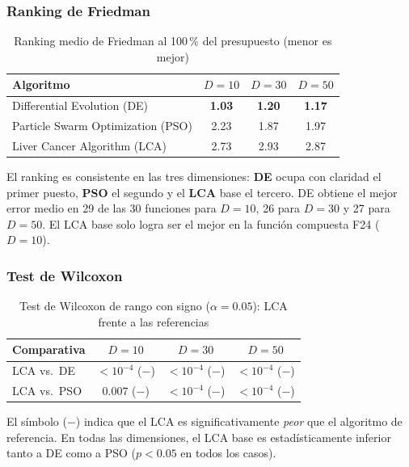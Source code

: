 \subsubsection{Ranking de Friedman}

\begin{table}[h!]
\centering
\caption{Ranking medio de Friedman al 100\,\% del presupuesto (menor es mejor)}
\label{tab:friedman}
\renewcommand{\arraystretch}{1.3}
\begin{tabular}{@{}lccc@{}}
\toprule
\textbf{Algoritmo} & \textbf{$D=10$} & \textbf{$D=30$} & \textbf{$D=50$} \\
\midrule
Differential Evolution (DE)        & \textbf{1.03} & \textbf{1.20} & \textbf{1.17} \\
Particle Swarm Optimization (PSO)  & 2.23 & 1.87 & 1.97 \\
Liver Cancer Algorithm (LCA)       & 2.73 & 2.93 & 2.87 \\
\bottomrule
\end{tabular}
\end{table}

El ranking es consistente en las tres dimensiones: \textbf{DE} ocupa con claridad el primer
puesto, \textbf{PSO} el segundo y el \textbf{LCA} base el tercero. DE obtiene el mejor error
medio en 29 de las 30 funciones para $D=10$, 26 para $D=30$ y 27 para $D=50$. El LCA base
solo logra ser el mejor en la función compuesta F24 ($D=10$).

\subsubsection{Test de Wilcoxon}

\begin{table}[h!]
\centering
\caption{Test de Wilcoxon de rango con signo ($\alpha=0.05$): LCA frente a las referencias}
\label{tab:wilcoxon}
\renewcommand{\arraystretch}{1.3}
\begin{tabular}{@{}lccc@{}}
\toprule
\textbf{Comparativa} & \textbf{$D=10$} & \textbf{$D=30$} & \textbf{$D=50$} \\
\midrule
LCA vs.\ DE  & $<10^{-4}$ ($-$) & $<10^{-4}$ ($-$) & $<10^{-4}$ ($-$) \\
LCA vs.\ PSO & $0.007$ ($-$)    & $<10^{-4}$ ($-$) & $<10^{-4}$ ($-$) \\
\bottomrule
\end{tabular}
\end{table}

El símbolo ($-$) indica que el LCA es significativamente \emph{peor} que el algoritmo de
referencia. En todas las dimensiones, el LCA base es estadísticamente inferior tanto a DE
como a PSO ($p < 0.05$ en todos los casos).

